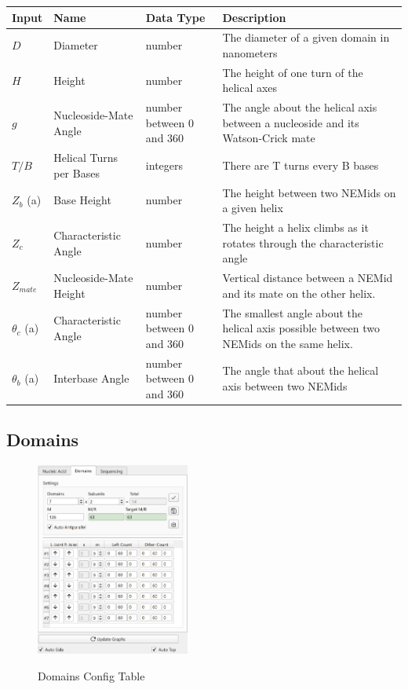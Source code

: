 \documentclass[titlepage]{article}
\begin{document}
	\begin{tabular}{|p{.5in}|p{1in}|p{.7in}|p{1.5in}|}
		\label{tab:setting-descriptions}
		\centering
		Input & Name & Data Type & Description \\
		\hline
		$D$ & Diameter & number & The diameter of a given domain in nanometers \\ \hline
		$H$ & Height & number & The height of one turn of the helical axes \\ \hline
		$g$ & Nucleoside-Mate Angle & number between 0 and 360 & The angle about the helical axis between a nucleoside and its Watson-Crick mate \\ \hline
		$T/B$ & Helical Turns per Bases & integers & There are T turns every B bases \\ \hline
		$Z_b$ (a) & Base Height & number & The height between two NEMids on a given helix \\ \hline
		$Z_c$ & Characteristic Angle & number & The height a helix climbs as it rotates through the characteristic angle \\ \hline
		$Z_{mate}$ & Nucleoside-Mate Height & number & Vertical distance between a NEMid and its mate on the other helix. \\ \hline
		$\theta_{c}$ (a) & Characteristic Angle & number between 0 and 360 & The smallest angle about the helical axis possible between two NEMids on the same helix. \\ \hline
		$\theta_{b}$ (a) & Interbase Angle & number between 0 and 360 & The angle that about the helical axis between two NEMids \\
	\end{tabular}

	\newpage
	
	\subsection{Domains}
	
	\begin{figure}[h]
		\centering
		\caption{Domains Config Table}
		\includegraphics[height=2.5in]{domain-config-table.png}
		\label{fig:domain-config-table}
	\end{figure}
\end{document}
